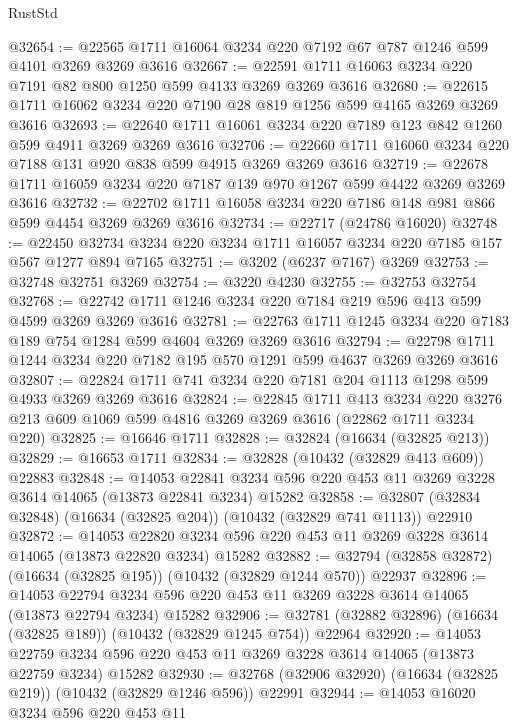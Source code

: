 \begin{lexlean}{RustStd}
\begin{coremodule}
@32654 := @22565 @1711 @16064 @3234 @220 @7192 @67 @787 @1246 @599 @4101 @3269 @3269 @3616
@32667 := @22591 @1711 @16063 @3234 @220 @7191 @82 @800 @1250 @599 @4133 @3269 @3269 @3616
@32680 := @22615 @1711 @16062 @3234 @220 @7190 @28 @819 @1256 @599 @4165 @3269 @3269 @3616
@32693 := @22640 @1711 @16061 @3234 @220 @7189 @123 @842 @1260 @599 @4911 @3269 @3269 @3616
@32706 := @22660 @1711 @16060 @3234 @220 @7188 @131 @920 @838 @599 @4915 @3269 @3269 @3616
@32719 := @22678 @1711 @16059 @3234 @220 @7187 @139 @970 @1267 @599 @4422 @3269 @3269 @3616
@32732 := @22702 @1711 @16058 @3234 @220 @7186 @148 @981 @866 @599 @4454 @3269 @3269 @3616
@32734 := @22717 (@24786 @16020)
@32748 := @22450 @32734 @3234 @220 @3234 @1711 @16057 @3234 @220 @7185 @157 @567 @1277 @894 @7165
@32751 := @3202 (@6237 @7167) @3269
@32753 := @32748 @32751 @3269
@32754 := @3220 @4230
@32755 := @32753 @32754
@32768 := @22742 @1711 @1246 @3234 @220 @7184 @219 @596 @413 @599 @4599 @3269 @3269 @3616
@32781 := @22763 @1711 @1245 @3234 @220 @7183 @189 @754 @1284 @599 @4604 @3269 @3269 @3616
@32794 := @22798 @1711 @1244 @3234 @220 @7182 @195 @570 @1291 @599 @4637 @3269 @3269 @3616
@32807 := @22824 @1711 @741 @3234 @220 @7181 @204 @1113 @1298 @599 @4933 @3269 @3269 @3616
@32824 := @22845
    @1711
    @413
    @3234
    @220
    @3276
    @213
    @609
    @1069
    @599
    @4816
    @3269
    @3269
    @3616
    (@22862 @1711 @3234 @220)
@32825 := @16646 @1711
@32828 := @32824 (@16634 (@32825 @213))
@32829 := @16653 @1711
@32834 := @32828 (@10432 (@32829 @413 @609)) @22883
@32848 := @14053
    @22841
    @3234
    @596
    @220
    @453
    @11
    @3269
    @3228
    @3614
    @14065
    (@13873 @22841 @3234)
    @15282
@32858 := @32807 (@32834 @32848) (@16634 (@32825 @204)) (@10432 (@32829 @741 @1113)) @22910
@32872 := @14053
    @22820
    @3234
    @596
    @220
    @453
    @11
    @3269
    @3228
    @3614
    @14065
    (@13873 @22820 @3234)
    @15282
@32882 := @32794 (@32858 @32872) (@16634 (@32825 @195)) (@10432 (@32829 @1244 @570)) @22937
@32896 := @14053
    @22794
    @3234
    @596
    @220
    @453
    @11
    @3269
    @3228
    @3614
    @14065
    (@13873 @22794 @3234)
    @15282
@32906 := @32781 (@32882 @32896) (@16634 (@32825 @189)) (@10432 (@32829 @1245 @754)) @22964
@32920 := @14053
    @22759
    @3234
    @596
    @220
    @453
    @11
    @3269
    @3228
    @3614
    @14065
    (@13873 @22759 @3234)
    @15282
@32930 := @32768 (@32906 @32920) (@16634 (@32825 @219)) (@10432 (@32829 @1246 @596)) @22991
@32944 := @14053
    @16020
    @3234
    @596
    @220
    @453
    @11

\end{coremodule}
\end{lexlean}
